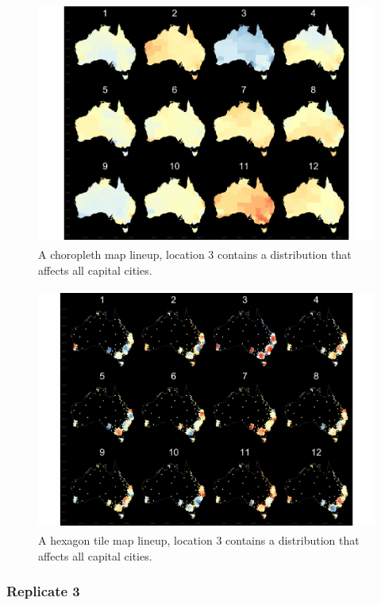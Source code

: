 \documentclass{monashthesis}
\begin{document}
\begin{figure}[H]
\centering
\includegraphics[height=8cm]{lineups/cities-geo3-1.pdf}
\caption{\label{fig:cities-geo3}A choropleth map lineup, location 3 contains a distribution that affects all capital cities.}
\end{figure}

\begin{figure}[H]
\centering
\includegraphics[height=8cm]{lineups/cities-hex3-1.pdf}
\caption{\label{fig:cities-hex3}A hexagon tile map lineup, location 3 contains a distribution that affects all capital cities.}
\end{figure}

\hypertarget{replicate-3}{%
\subsubsection{Replicate 3}\label{replicate-3}}
\end{document}

